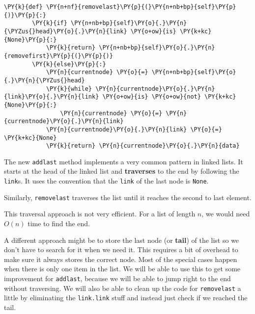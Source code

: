 \begin{Verbatim}[commandchars=\\\{\}]
    \PY{k}{def} \PY{n+nf}{removelast}\PY{p}{(}\PY{n+nb+bp}{self}\PY{p}{)}\PY{p}{:}
        \PY{k}{if} \PY{n+nb+bp}{self}\PY{o}{.}\PY{n}{\PYZus{}head}\PY{o}{.}\PY{n}{link} \PY{o+ow}{is} \PY{k+kc}{None}\PY{p}{:}
            \PY{k}{return} \PY{n+nb+bp}{self}\PY{o}{.}\PY{n}{removefirst}\PY{p}{(}\PY{p}{)}
        \PY{k}{else}\PY{p}{:}
            \PY{n}{currentnode} \PY{o}{=} \PY{n+nb+bp}{self}\PY{o}{.}\PY{n}{\PYZus{}head}
            \PY{k}{while} \PY{n}{currentnode}\PY{o}{.}\PY{n}{link}\PY{o}{.}\PY{n}{link} \PY{o+ow}{is} \PY{o+ow}{not} \PY{k+kc}{None}\PY{p}{:}
                \PY{n}{currentnode} \PY{o}{=} \PY{n}{currentnode}\PY{o}{.}\PY{n}{link}
            \PY{n}{currentnode}\PY{o}{.}\PY{n}{link} \PY{o}{=} \PY{k+kc}{None}
            \PY{k}{return} \PY{n}{currentnode}\PY{o}{.}\PY{n}{data}
\end{Verbatim}



The new \texttt{addlast} method implements a very common pattern in linked lists.
It starts at the head of the linked list and \textbf{traverses} to the end by following the \texttt{link}s.
It uses the convention that the \texttt{link} of the last node is \texttt{None}.


Similarly, \texttt{removelast} traverses the list until it reaches the second to last element.


This traversal approach is not very efficient.
For a list of length $n$, we would need $O(n)$ time to find the end.


A different approach might be to store the last node (or \textbf{tail}) of the list so we don't have to search for it when we need it.
This requires a bit of overhead to make sure it always stores the correct node.
Most of the special cases happen when there is only one item in the list.
We will be able to use this to get some improvement for \texttt{addlast}, because we will be able to jump right to the end without traversing.  We will also be able to clean up the code for \texttt{removelast} a little by eliminating the \texttt{link.link} stuff and instead just check if we reached the tail.

